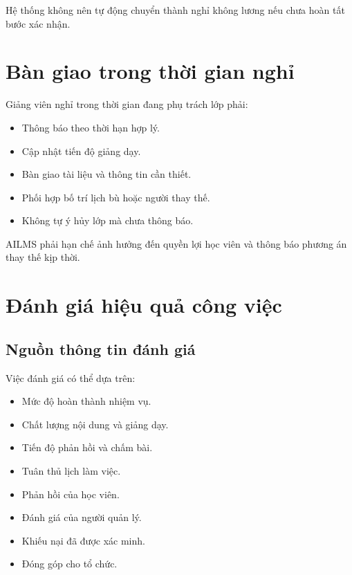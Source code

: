 \documentclass[12pt,a4paper]{article}
\begin{document}
Hệ thống không nên tự động chuyển thành nghỉ không lương
nếu chưa hoàn tất bước xác nhận.

\section{Bàn giao trong thời gian nghỉ}

Giảng viên nghỉ trong thời gian đang phụ trách lớp phải:

\begin{itemize}
    \item Thông báo theo thời hạn hợp lý.
    \item Cập nhật tiến độ giảng dạy.
    \item Bàn giao tài liệu và thông tin cần thiết.
    \item Phối hợp bố trí lịch bù hoặc người thay thế.
    \item Không tự ý hủy lớp mà chưa thông báo.
\end{itemize}

AILMS phải hạn chế ảnh hưởng đến quyền lợi học viên
và thông báo phương án thay thế kịp thời.

\section{Đánh giá hiệu quả công việc}

\subsection{Nguồn thông tin đánh giá}

Việc đánh giá có thể dựa trên:

\begin{itemize}
    \item Mức độ hoàn thành nhiệm vụ.
    \item Chất lượng nội dung và giảng dạy.
    \item Tiến độ phản hồi và chấm bài.
    \item Tuân thủ lịch làm việc.
    \item Phản hồi của học viên.
    \item Đánh giá của người quản lý.
    \item Khiếu nại đã được xác minh.
    \item Đóng góp cho tổ chức.
\end{itemize}
\end{document}
